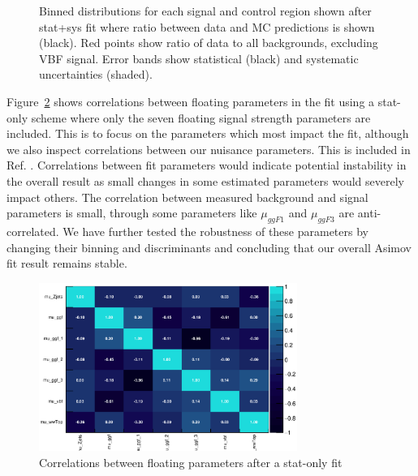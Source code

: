 \begin{figure}[!h]
{  }\hfill
  \hfill
{\caption{Binned distributions for each signal and control region shown after stat+sys fit where ratio between data and MC predictions is shown (black). Red points show ratio of data to all backgrounds, excluding VBF signal. Error bands show statistical (black) and systematic uncertainties (shaded).}
\label{fig:fitresultsregions}}
\end{figure}

Figure~\ref{fig:correlations} shows correlations between floating parameters in the fit using a stat-only scheme where only the seven floating signal strength parameters are included. This is to focus on the parameters which most impact the fit, although we also inspect correlations between our nuisance parameters. This is included in Ref. \cite{ourSupportNote}. Correlations between fit parameters would indicate potential instability in the overall result as small changes in some estimated parameters would severely impact others. The correlation between measured background and signal parameters is small, through some parameters like $\mu_{ggF1}$ and $\mu_{ggF3}$ are anti-correlated. We have further tested the robustness of these parameters by changing their binning and discriminants and concluding that our overall Asimov fit result remains stable.  

\begin{figure}[!h]
\centering
\includegraphics[width=0.75\textwidth]{Pictures/fitresults/correlation_stat.eps}
\caption{Correlations between floating parameters after a stat-only fit}
\label{fig:correlations}
\end{figure}

